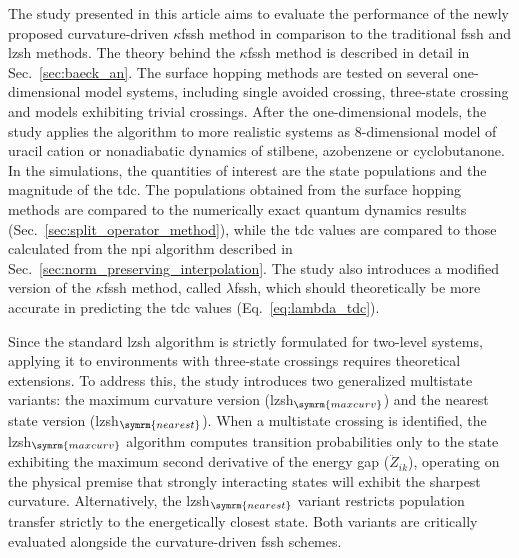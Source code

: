 The study presented in this article aims to evaluate the performance of the newly proposed curvature-driven $\kappa$\gls{fssh} method in comparison to the traditional \gls{fssh} and \gls{lzsh} methods. The theory behind the $\kappa$\gls{fssh} method is described in detail in Sec.~\ref{sec:baeck_an}. The surface hopping methods are tested on several one-dimensional model systems, including single avoided crossing, three-state crossing and models exhibiting trivial crossings. After the one-dimensional models, the study applies the algorithm to more realistic systems as 8-dimensional model of uracil cation or nonadiabatic dynamics of stilbene, azobenzene or cyclobutanone. In the simulations, the quantities of interest are the state populations and the magnitude of the \gls{tdc}. The populations obtained from the surface hopping methods are compared to the numerically exact quantum dynamics results (Sec.~\ref{sec:split_operator_method}), while the \gls{tdc} values are compared to those calculated from the \gls{npi} algorithm described in Sec.~\ref{sec:norm_preserving_interpolation}. The study also introduces a modified version of the $\kappa$\gls{fssh} method, called $\lambda$\gls{fssh}, which should theoretically be more accurate in predicting the \gls{tdc} values (Eq.~\eqref{eq:lambda_tdc}).

Since the standard \gls{lzsh} algorithm is strictly formulated for two-level systems, applying it to environments with three-state crossings requires theoretical extensions. To address this, the study introduces two generalized multistate variants: the maximum curvature version (\gls{lzsh}$_{\symrm{maxcurv}}$) and the nearest state version (\gls{lzsh}$_{\symrm{nearest}}$). When a multistate crossing is identified, the \gls{lzsh}$_{\symrm{maxcurv}}$ algorithm computes transition probabilities only to the state exhibiting the maximum second derivative of the energy gap ($\ddot{Z}_{ik}$), operating on the physical premise that strongly interacting states will exhibit the sharpest curvature. Alternatively, the \gls{lzsh}$_{\symrm{nearest}}$ variant restricts population transfer strictly to the energetically closest state. Both variants are critically evaluated alongside the curvature-driven \gls{fssh} schemes.
